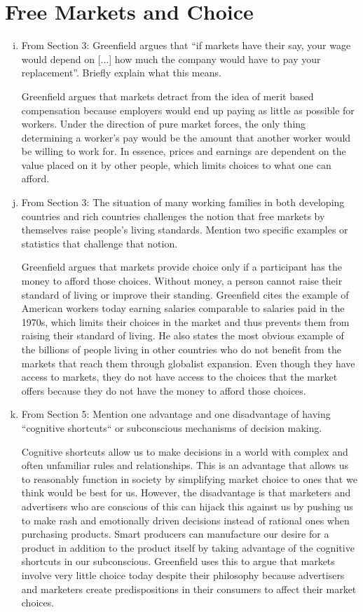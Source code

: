 \documentclass{article}
\begin{document}
\section*{Free Markets and Choice}
\begin{enumerate}[a)]
  \setcounter{enumi}{8}
  \item From Section 3: Greenfield argues that ``if markets have their say, your wage would depend on [...] how much the company would have to pay your replacement''. Briefly explain what this means.
  \par Greenfield argues that markets detract from the idea of merit based compensation because employers would end up paying as little as possible for workers. Under the direction of pure market forces, the only thing determining a worker's pay would be the amount that another worker would be willing to work for. In essence, prices and earnings are dependent on the value placed on it by other people, which limits choices to what one can afford.
  \item From Section 3: The situation of many working families in both developing countries and rich countries challenges the notion that free markets by themselves raise people's living standards. Mention two specific examples or statistics that challenge that notion.
  \par Greenfield argues that markets provide choice only if a participant has the money to afford those choices. Without money, a person cannot raise their standard of living or improve their standing. Greenfield cites the example of American workers today earning salaries comparable to salaries paid in the 1970s, which limits their choices in the market and thus prevents them from raising their standard of living. He also states the most obvious example of the billions of people living in other countries who do not benefit from the markets that reach them through globalist expansion. Even though they have access to markets, they do not have access to the choices that the market offers because they do not have the money to afford those choices.
  \item From Section 5: Mention one advantage and one disadvantage of having ``cognitive shortcuts`` or subconscious mechanisms of decision making.
  \par Cognitive shortcuts allow us to make decisions in a world with complex and often unfamiliar rules and relationships. This is an advantage that allows us to reasonably function in society by simplifying market choice to ones that we think would be best for us. However, the disadvantage is that marketers and advertisers who are conscious of this can hijack this against us by pushing us to make rash and emotionally driven decisions instead of rational ones when purchasing products. Smart producers can manufacture our desire for a product in addition to the product itself by taking advantage of the cognitive shortcuts in our subconscious. Greenfield uses this to argue that markets involve very little choice today despite their philosophy because advertisers and marketers create predispositions in their consumers to affect their market choices.

\end{enumerate}
\end{document}

